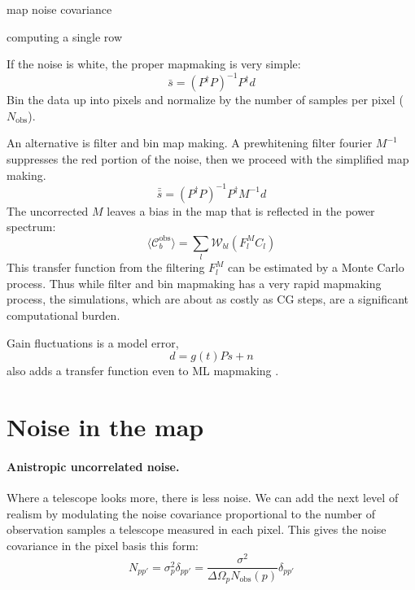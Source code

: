 map noise covariance
 
computing a single row

If the noise is white, the proper mapmaking is very simple:
\begin{equation}
  \bar s =  (P^\dag P)^{-1} P^\dag d
\end{equation}
Bin the data up into pixels and normalize by the number of samples per pixel ($N_\textrm{obs}$).


An alternative is filter and bin map making.  A prewhitening filter fourier $M^{-1}$ suppresses the red portion of the noise, then we proceed with the simplified map making.
\begin{equation}
  \bar{\bar s} =  (P^\dag P)^{-1} P^\dag M^{-1} d
\end{equation}
The uncorrected $M$ leaves a bias in the map that is reflected in the power spectrum:
\begin{equation}
  \langle \mathcal{C}^\textrm{obs}_b \rangle = \sum_l \mathcal{W}_{bl} (F^M_l C_l)
\end{equation}
This transfer function from the filtering $F^M_l$ can be estimated by a Monte Carlo process.  Thus while filter and bin mapmaking has a very rapid mapmaking process, the simulations, which are about as costly as CG steps, are a significant computational burden.

Gain fluctuations is a model error,
\begin{equation}
  d = g(t) Ps + n
\end{equation}
also adds a transfer function even to ML mapmaking \cite{Naess_and_Louis}.


\section{Noise in the map}

\paragraph{Anistropic uncorrelated noise.}  Where a telescope looks more, there is less noise.
We can add the next level of realism by modulating the noise covariance proportional to the number of observation samples a telescope measured in each pixel.  This gives the noise covariance in the pixel basis this form:
\begin{equation}
N_{pp'} =  \sigma^2_p \delta_{pp'}= \frac{\sigma^2}{\Delta\Omega_p N_\textrm{obs}(p)}  \delta_{pp'}
\end{equation}

